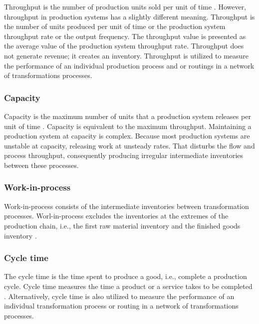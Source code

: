 \documentclass{article}
\begin{document}
Throughput is the number of production units sold per unit of time \citep{Hopp2001}.
However, throughput in production systems has a slightly different meaning.
Throughput is the number of units produced per unit of time or the production system throughput rate or the output frequency.
The throughput value is presented as the average value of the production system throughput rate.
Throughput does not generate revenue; it creates an inventory.
Throughput is utilized to measure the performance of an individual production process and or routings in a network of transformations processes.

\subsubsection{Capacity \label{capacity}}
\label{sec:org4fb5580}

Capacity is the maximum number of units that a production system releases per unit of time \citep{Hopp2001}.
Capacity is equivalent to the maximum throughput.
Maintaining a production system at capacity is complex.
Because most production systems are unstable at capacity, releasing work at unsteady rates.
That disturbs the flow and process throughput, consequently producing irregular intermediate inventories between these processes.

\subsubsection{Work-in-process \label{work-in-process}}
\label{sec:org1862744}

Work-in-process consists of the intermediate inventories between transformation processes.
Worl-in-process excludes the inventories at the extremes of the production chain, i.e., the first raw material inventory and the finished goods inventory \citep{Hopp2001}.

\subsubsection{Cycle time \label{cycle_time}}
\label{sec:org1e2dc2f}

The cycle time is the time spent to produce a good, i.e., complete a production cycle.
Cycle time measures the time a product or a service takes to be completed \citep{Hopp2001}.
Alternatively, cycle time is also utilized to measure the performance of an individual transformation process or routing in a network of transformations processes.
\end{document}
